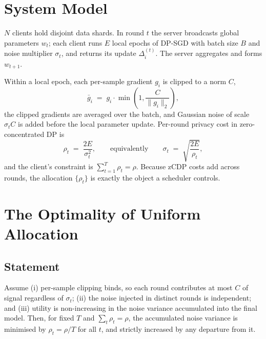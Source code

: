 \section{System Model}

$N$ clients hold disjoint data shards. In round $t$ the server broadcasts global
parameters $w_t$; each client runs $E$ local epochs of DP-SGD with batch size
$B$ and noise multiplier $\sigma_t$, and returns its update $\Delta_i^{(t)}$.
The server aggregates and forms $w_{t+1}$.

\vspace{10pt}

Within a local epoch, each per-sample gradient $g_i$ is clipped to a norm $C$,
\begin{equation}
  \bar{g}_i \;=\; g_i \cdot \min\!\left(1, \frac{C}{\lVert g_i \rVert_2}\right),
  \label{eq:clip}
\end{equation}
the clipped gradients are averaged over the batch, and Gaussian noise of scale
$\sigma_t C$ is added before the local parameter update. Per-round privacy cost
in zero-concentrated DP \cite{bun2016concentrated} is
\begin{equation}
  \rho_t \;=\; \frac{2E}{\sigma_t^{2}},
  \qquad\text{equivalently}\qquad
  \sigma_t \;=\; \sqrt{\frac{2E}{\rho_t}},
  \label{eq:budget}
\end{equation}
and the client's constraint is $\sum_{t=1}^{T}\rho_t = \rho$. Because zCDP costs
add across rounds, the allocation $\{\rho_t\}$ is exactly the object a scheduler
controls.

\section{The Optimality of Uniform Allocation}
\label{sec:theory}

\subsection{Statement}

\begin{theorem}
\label{thm:uniform}
Assume (i) per-sample clipping binds, so each round contributes at most $C$ of
signal regardless of $\sigma_t$; (ii) the noise injected in distinct rounds is
independent; and (iii) utility is non-increasing in the noise variance
accumulated into the final model. Then, for fixed $T$ and $\sum_t\rho_t=\rho$,
the accumulated noise variance is minimised by $\rho_t = \rho/T$ for all $t$,
and strictly increased by any departure from it.
\end{theorem}

